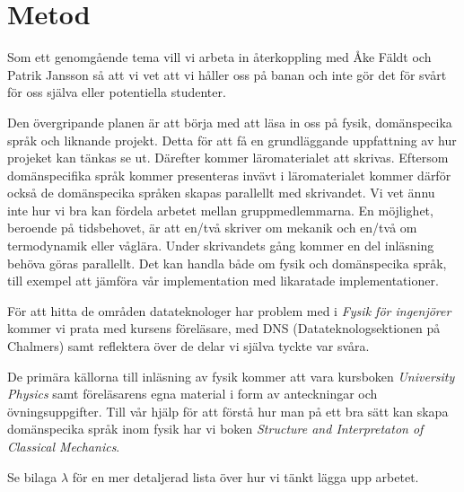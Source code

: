 \chapter{Metod}
Som ett genomgående tema vill vi arbeta in återkoppling med Åke Fäldt och Patrik
Jansson så att vi vet att vi håller oss på banan och inte gör det för svårt för
oss själva eller potentiella studenter.

Den övergripande planen är att börja med att läsa in oss på fysik, domänspecika
språk och liknande projekt. Detta för att få en grundläggande uppfattning av hur
projeket kan tänkas se ut. Därefter kommer läromaterialet att skrivas. Eftersom
domänspecifika språk kommer presenteras invävt i läromaterialet kommer därför
också de domänspecika språken skapas parallellt med skrivandet. Vi vet ännu inte
hur vi bra kan fördela arbetet mellan gruppmedlemmarna. En möjlighet, beroende
på tidsbehovet, är att en/två skriver om mekanik och en/två om termodynamik
eller våglära. Under skrivandets gång kommer en del inläsning behöva göras
parallellt. Det kan handla både om fysik och domänspecika språk, till exempel
att jämföra vår implementation med likaratade implementationer.

För att hitta de områden datateknologer har problem med i \textit{Fysik för
ingenjörer} kommer vi prata med kursens föreläsare, med DNS
(Datateknologsektionen på Chalmers) samt reflektera över de delar vi själva
tyckte var svåra.

De primära källorna till inläsning av fysik kommer att vara kursboken
\textit{University Physics}\cite{UP} samt föreläsarens egna material i form av
anteckningar och övningsuppgifter. Till vår hjälp för att förstå hur man på ett
bra sätt kan skapa domänspecika språk inom fysik har vi boken \textit{Structure
and Interpretaton of Classical Mechanics}\cite{SICM}.

Se bilaga $\lambda$ för en mer detaljerad lista över hur vi tänkt lägga upp arbetet.

